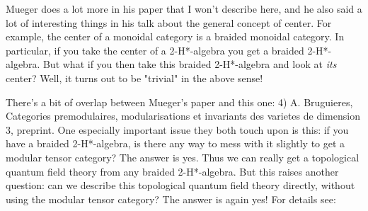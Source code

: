 Mueger does a lot more in his paper that I won't describe here,
and he also said a lot of interesting things in his talk about
the general concept of center.  For example, the center of a
monoidal category is a braided monoidal category.  In particular,
if you take the center of a 2-H*-algebra you get a braided
2-H*-algebra.  But what if you then take this braided 2-H*-algebra
and look at \emph{its} center?  Well, it turns out to be "trivial" in 
the above sense!

There's a bit of overlap between Mueger's paper and this one:
4) A. Bruguieres, Categories premodulaires, modularisations et 
invariants des varietes de dimension 3, preprint.  
One especially important issue they both touch upon is this:
if you have a braided 2-H*-algebra, is there any way to mess
with it slightly to get a modular tensor category?  The answer
is yes.  Thus we can really get a topological quantum field theory 
from any braided 2-H*-algebra.  But this raises another question:
can we describe this topological quantum field theory directly,
without using the modular tensor category?  The answer is again
yes!  For details see:

